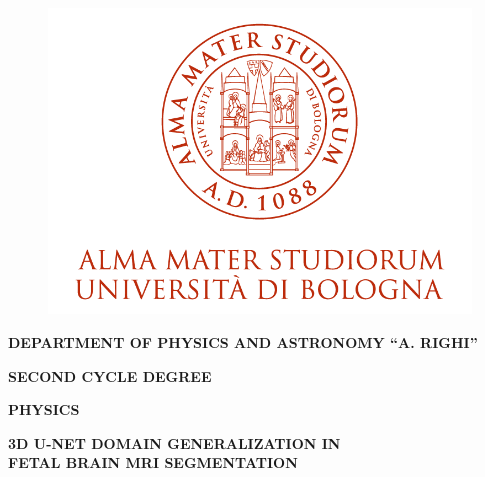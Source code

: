 \documentclass[12pt,a4paper]{report}
\begin{document}
\begin{titlepage}
        \thispagestyle{fancy}
    \begin{figure}[h]
        \vspace{-0.5cm} %
        \centering
        \includegraphics[scale=1.05]{logo_unibo.png}
    \end{figure}

    \vspace{3mm}

    \begin{center}
        \bf {DEPARTMENT OF PHYSICS AND ASTRONOMY ``A. RIGHI''}
    \end{center}

    \begin{center}
        \bf \large{SECOND CYCLE DEGREE}

        \bf \large{PHYSICS}
    \end{center}

    \vspace{15mm}

    \begin{center}
        {\huge{\bf 3D U-NET DOMAIN GENERALIZATION IN}}
        \vspace{15pt}\\
        {\huge{\bf FETAL BRAIN MRI SEGMENTATION}}
    \end{center}

    \vspace{50mm} \par \noindent


\end{titlepage}
\end{document}
